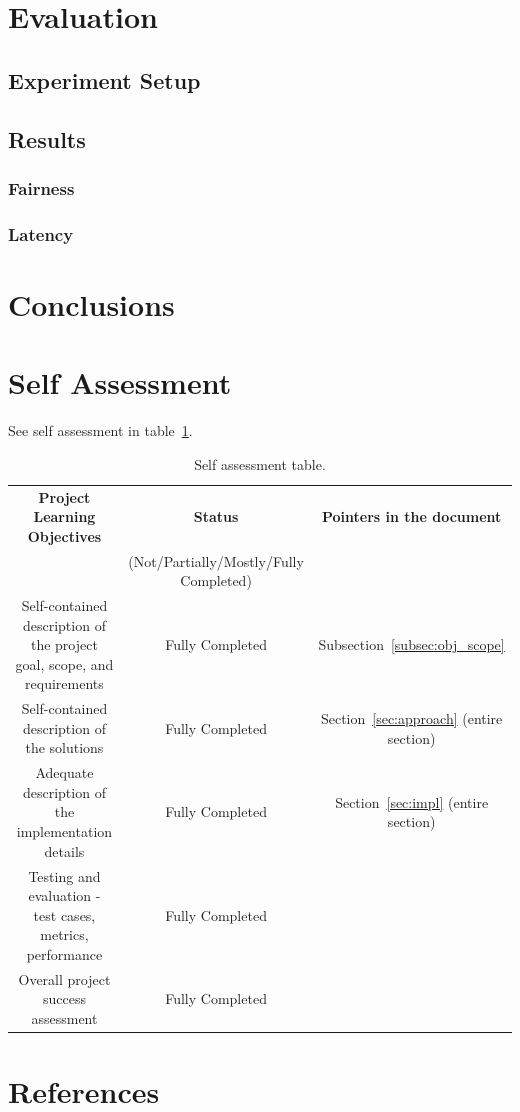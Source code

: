 \documentclass[conference]{IEEEtran}
\begin{document}
    \section{Evaluation}
    \subsection{Experiment Setup}

    \subsection{Results}

    \subsubsection{Fairness}

    \subsubsection{Latency}

    \section{Conclusions}

    \section{Self Assessment}
    See self assessment in table~\ref{tab:self-assmt}.

    \begin{table}[b]
        \centering
        \caption{Self assessment table.}
        \label{tab:self-assmt}
        \begin{tabular}{|c|c|c|}
            \hline
            \textbf{Project Learning Objectives} & \textbf{Status} & \textbf{Pointers in the document} \\
             & (Not/Partially/Mostly/Fully Completed) &  \\
            \hline
            Self-contained description of the project goal, scope, and requirements & Fully Completed & Subsection~\ref{subsec:obj_scope} \\
            \hline
            Self-contained description of the solutions & Fully Completed & Section~\ref{sec:approach} (entire section)\\
            \hline
            Adequate description of the implementation details & Fully Completed & Section~\ref{sec:impl} (entire section)\\
            \hline
            Testing and evaluation - test cases, metrics, performance & Fully Completed & \\
            \hline
            Overall project success assessment & Fully Completed & \\
            \hline
        \end{tabular}

    \end{table}

    \section{References}
    
    
\end{document}
